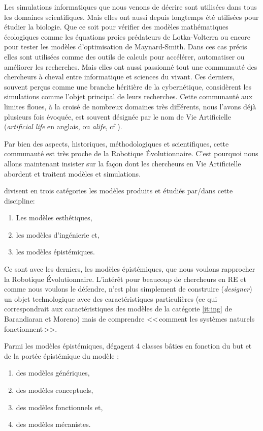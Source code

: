 Les simulations informatiques que nous venons de décrire sont utilisées dans tous les domaines scientifiques. Mais elles ont aussi depuis longtemps été utilisées pour étudier la biologie. Que ce soit pour vérifier des modèles mathématiques écologiques comme les équations proies prédateurs de Lotka-Volterra ou encore pour tester les modèles d'optimisation de Maynard-Smith. Dans ces cas précis elles sont utilisées comme des outils de calculs pour accélérer, automatiser ou améliorer les recherches. Mais elles ont aussi passionné tout une communauté des chercheurs à cheval entre informatique et sciences du vivant. Ces derniers, souvent perçus comme une branche héritière de la cybernétique, considèrent les simulations comme l'objet principal de leurs recherches. Cette communauté aux limites floues, à la croisé de nombreux domaines très différents, nous l'avons déjà plusieurs fois évoquée, est souvent désignée par le nom de Vie Artificielle (\emph{artificial life} en anglais, ou \emph{alife}, cf \citet{langton89alifeiproceedingsfirstinternationalworkshopsynthesissimulationlivingsystems}). 

Par bien des aspects, historiques, méthodologiques et scientifiques, cette communauté est très proche de la Robotique Évolutionnaire. C'est pourquoi nous allons maintenant insister sur la façon dont les chercheurs en Vie Artificielle abordent et traitent modèles et simulations.

\citet{barandiaran06alifemodelsasepistemicartefacts} divisent en trois catégories les modèles produits et étudiés par/dans cette discipline:
\begin{enumerate}
	\item Les modèles esthétiques, \label{it:est}
	\item les modèles d'ingénierie et,\label{it:ing}
	\item les modèles épistémiques. \label{it:epi}
\end{enumerate}

Ce sont avec les derniers, les modèles épistémiques, que nous voulons rapprocher la Robotique Évolutionnaire. L'intérêt pour beaucoup de chercheurs en RE et comme nous voulons le défendre, n'est plus simplement de construire (\emph{designer}) un objet technologique avec des caractéristiques particulières (ce qui correspondrait aux caractéristiques des modèles de la catégorie \ref{it:ing} de Barandiaran et Moreno)
mais de comprendre <<\,comment les systèmes naturels fonctionnent\,>>.

Parmi les modèles épistémiques, \citet{barandiaran06alifemodelsasepistemicartefacts} dégagent 4 classes bâties en fonction du but et de la portée épistémique du modèle :
\begin{enumerate}[\hspace{1cm}(a)]
	\item des modèles génériques, \label{it:gnx}
	\item des modèles conceptuels, \label{it:con}
	\item des modèles fonctionnels et,\label{it:fun}
	\item des modèles mécanistes. \label{it:mech}
\end{enumerate}

